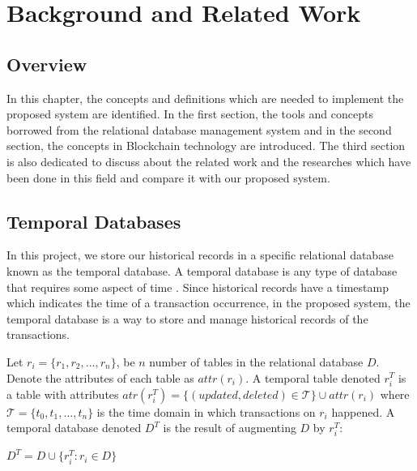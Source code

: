 \chapter{Background and Related Work}

\section{Overview}

In this chapter, the concepts and definitions which are needed to implement the proposed system are identified. In the first section, the tools and concepts borrowed from the relational database management system and in the second section, the concepts in Blockchain technology are introduced. The third section is also dedicated to discuss about the related work and the researches which have been done in this field and compare it with our proposed system.

\section{Temporal Databases}
In this project, we store our historical records in a specific relational database known as the temporal database. A temporal database is any type of database that requires some aspect of time \cite {elmasri2010fundamentalsofdatabase}. Since historical records have a timestamp which indicates the time of a transaction occurrence, in the proposed system, the temporal database is a way to store and manage historical records of the transactions.


\begin{defn}
	Let $ r_i = \{r_1, r_2, ... , r_n \}$, be $n$ number of tables in the relational database $D$. Denote the attributes of each table as $attr(r_i)$. A temporal table denoted $r_i^T$ is a table with attributes $atr(r_i^T) = \{ (updated, deleted) \in \mathcal{T} \}\cup attr(r_i)$ where $\mathcal{T} = \{t_0,t_1,...,t_n\}$ is the time domain in which transactions on $r_i$ happened. A temporal database denoted $D^T$ is the result of augmenting $D$ by $r_i^T$:

	\begin{center}
		{$D^T = D \cup \{{r_i^T}: r_i \in D \}$}
	\end{center}
\label{dfn:temporal_database}
\end {defn}

